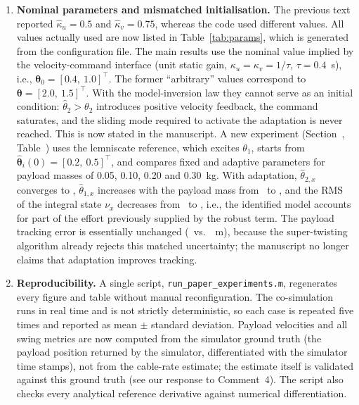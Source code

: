 \begin{reply}
\begin{enumerate}
\item \textbf{Nominal parameters and mismatched initialisation.} The previous text reported $\hat{\kappa}_u=0.5$ and $\hat{\kappa}_v=0.75$, whereas the code used different values. All values actually used are now listed in Table~\ref{tab:params}, which is generated from the configuration file. The main results use the nominal value implied by the velocity-command interface (unit static gain, $\kappa_u=\kappa_v=1/\tau$, $\tau=0.4$~s), i.e., $\boldsymbol{\theta}_0=[0.4,\ 1.0]^\top$. The former ``arbitrary'' values correspond to $\boldsymbol{\theta}=[2.0,\ 1.5]^\top$. With the model-inversion law they cannot serve as an initial condition: $\hat\theta_{2}>\theta_2$ introduces positive velocity feedback, the command saturates, and the sliding mode required to activate the adaptation is never reached. This is now stated in the manuscript. A new experiment (Section~\XX, Table~\XX) uses the lemniscate reference, which excites $\theta_{1}$, starts from $\hat{\boldsymbol{\theta}}_i(0)=[0.2,\ 0.5]^\top$, and compares fixed and adaptive parameters for payload masses of 0.05, 0.10, 0.20 and 0.30~kg. With adaptation, $\hat\theta_{2,x}$ converges to \XX, $\hat\theta_{1,x}$ increases with the payload mass from \XX\ to \XX, and the RMS of the integral state $\nu_x$ decreases from \XX\ to \XX, i.e., the identified model accounts for part of the effort previously supplied by the robust term. The payload tracking error is essentially unchanged (\XX\ vs.\ \XX~m), because the super-twisting algorithm already rejects this matched uncertainty; the manuscript no longer claims that adaptation improves tracking.

\item \textbf{Reproducibility.} A single script, \texttt{run\_paper\_experiments.m}, regenerates every figure and table without manual reconfiguration. The co-simulation runs in real time and is not strictly deterministic, so each case is repeated five times and reported as mean $\pm$ standard deviation. Payload velocities and all swing metrics are now computed from the simulator ground truth (the payload position returned by the simulator, differentiated with the simulator time stamps), not from the cable-rate estimate; the estimate itself is validated against this ground truth (see our response to Comment~4). The script also checks every analytical reference derivative against numerical differentiation.
\end{enumerate}
\end{reply}

